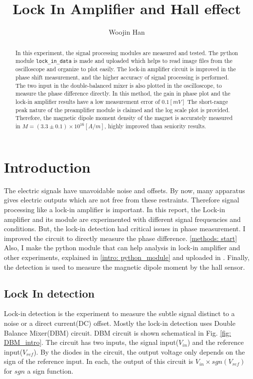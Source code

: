 \documentclass{article}
\begin{document}
\title{Lock In Amplifier and Hall effect}
\author[1]{Woojin Han}
\maketitle

\begin{abstract}
    In this experiment, the signal processing modules are measured and tested.
    The python module \verb|lock_in_data| is made and uploaded which helps to read image files from the oscilloscope and organize to plot easily.
    The lock-in amplifier circuit is improved in the phase shift measurement, and the higher accuracy of signal processing is performed.
    The two input in the double-balanced mixer is also plotted in the oscilloscope, to measure the phase difference directly.
    In this method, the gain in phase plot and the lock-in amplifier results have a low measurement error of $0.1 [mV]$
    The short-range peak nature of the preamplifier module is claimed and the log scale plot is provided.
    Therefore, the magnetic dipole moment density of the magnet is accurately measured in $M = (3.3 \pm 0.1) \times 10^{16} [A/m]$, highly improved than seniority results.
\end{abstract}

\section{Introduction}
 The electric signals have unavoidable noise and offsets.
 By now, many apparatus gives electric outputs which are not free from these restraints.
 Therefore signal processing like a lock-in amplifier is important.
 In this report, the Lock-in amplifier and its module are experimented with different signal frequencies and conditions.
 But, the lock-in detection had critical issues in phase measurement.
 I improved the circuit to directly measure the phase difference. \ref{methods: start}
 Also, I make the python module that can help analysis in lock-in amplifier and other experiments, explained in \ref{intro: python_module} and uploaded in \cite{github}.
 Finally, the detection is used to measure the magnetic dipole moment by the hall sensor.

\subsection{Lock In detection}
\label{intro: lock_in_detection}
 Lock-in detection is the experiment to measure the subtle signal distinct to a noise or a direct current(DC) offset.
 Mostly the lock-in detection uses Double Balance Mixer(DBM) circuit.
 DBM circuit is shown schematical in Fig. \ref{fig: DBM_intro}.
 The circuit has two inputs, the signal input($V_{in}$) and the reference input($V_{ref}$).
 By the diodes in the circuit, the output voltage only depends on the sign of the reference input.
 In each, the output of this circuit is $V_{in} \times sgn(V_{ref})$ for $sgn$ a sign function.
\end{document}
